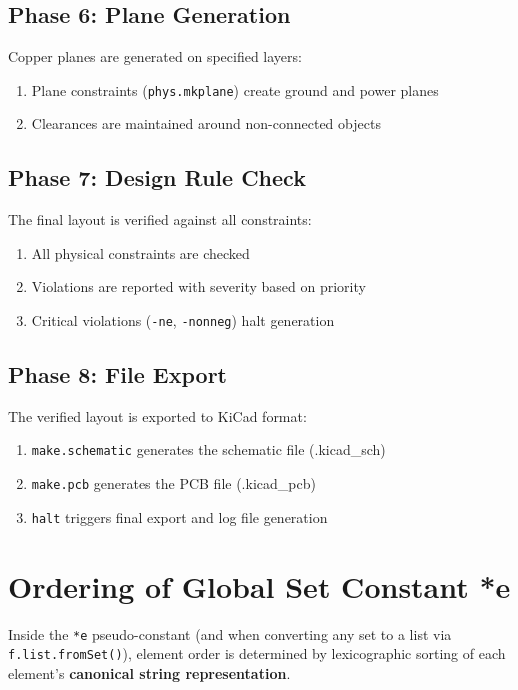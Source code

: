 \subsection{Phase 6: Plane Generation}
Copper planes are generated on specified layers:
\begin{enumerate}
\item Plane constraints (\texttt{phys.mkplane}) create ground and power planes
\item Clearances are maintained around non-connected objects
\end{enumerate}

\subsection{Phase 7: Design Rule Check}
The final layout is verified against all constraints:
\begin{enumerate}
\item All physical constraints are checked
\item Violations are reported with severity based on priority
\item Critical violations (\texttt{-ne}, \texttt{-nonneg}) halt generation
\end{enumerate}

\subsection{Phase 8: File Export}
The verified layout is exported to KiCad format:
\begin{enumerate}
\item \texttt{make.schematic} generates the schematic file (.kicad\_sch)
\item \texttt{make.pcb} generates the PCB file (.kicad\_pcb)
\item \texttt{halt} triggers final export and log file generation
\end{enumerate}

\section{Ordering of Global Set Constant *e}
Inside the \texttt{*e} pseudo-constant (and when converting any set to a list via \texttt{f.list.fromSet()}), element order is determined by lexicographic sorting of each element's \textbf{canonical string representation}.

